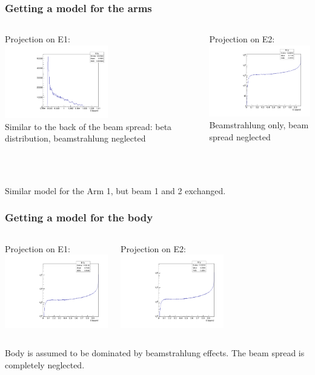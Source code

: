 \documentclass{beamer}
\begin{document}
\begin{frame}
\frametitle{Getting a model for the arms}
\begin{columns}[c]
\column{6cm}
\begin{center}
Projection on E1:\\
\includegraphics[width=4.5cm]{Arm2_projX.pdf}\\
Similar to the back of the beam spread: beta
distribution, beamstrahlung neglected
\end{center}
\column{6cm}
\begin{center}
Projection on E2:\\
\includegraphics[width=4.5cm]{Arm2_projY.pdf}\\
Beamstrahlung only, beam spread neglected
\end{center}
\end{columns}
~\\
~\\
Similar model for the Arm 1, but beam 1 and 2 exchanged.
\end{frame}

\begin{frame}
\frametitle{Getting a model for the body}
\begin{columns}[c]
\column{6cm}
\begin{center}
Projection on E1:\\
\includegraphics[width=4.5cm]{Body_projX.pdf}
\end{center}
\column{6cm}
\begin{center}
Projection on E2:\\
\includegraphics[width=4.5cm]{Body_projY.pdf}
\end{center}
\end{columns}
Body is assumed to be dominated by beamstrahlung effects. The beam spread is
completely neglected.
\end{frame}
\end{document}
